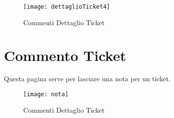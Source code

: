 \begin{figure}[H]
	\centering
    \texttt{[image: dettaglioTicket4]} 
\caption{Commenti Dettaglio Ticket}
\end{figure}
\newpage
\section{Commento Ticket}
Questa pagina serve per lasciare una nota per un ticket.


\begin{figure}[H]
	\centering
    \texttt{[image: nota]} 
\caption{Commenti Dettaglio Ticket}
\end{figure}
